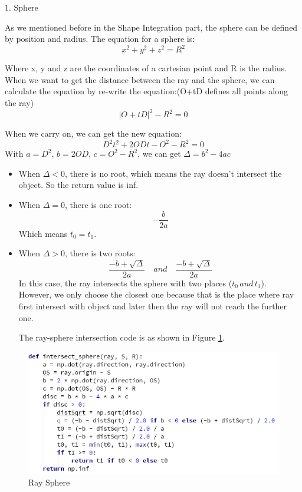 \documentclass[a4paper, 12pt]{article}
\begin{document}
1. Sphere

As we mentioned before in the Shape Integration part, the sphere can be defined by position and radius. The equation for a sphere is: $$ x^2 + y^2 + z^2 = R^2$$

Where x, y and z are the coordinates of a cartesian point and R is the radius. When we want to get the distance between the ray and the sphere, we can calculate the equation by re-write the equation:(O+tD defines all points along the ray) $$|O+ tD|^2 - R^2 = 0$$

When we carry on, we can get the new equation: $$D^2t^2+ 2ODt - O^2 - R^2= 0$$ With $a = D^2$, $b = 2OD $, $c = O^2 - R^2$, we can get $\Delta= b^2 - 4ac$

\begin{itemize}

\item When $\Delta < 0$, there is no root, which means the ray doesn't intersect the object. So the return value is inf.

\item When $\Delta = 0$, there is one root: $$-\frac{b}{2a}$$ Which means $t_0 = t_1$.

\item When $\Delta > 0$, there is two roots: $$\frac{-b + \sqrt{\Delta}}{2a}\quad and\quad \frac{-b + \sqrt{\Delta}}{2a}$$ In this case, the ray intersects the sphere with two places ($t_0\, and\, t_1$). However, we only choose the closest one because that is the place where ray first intersect with object and later then the ray will not reach the further one.

The ray-sphere intersection code is as shown in Figure \ref{fig:Ray Sphere}.
\end{itemize}

\begin{figure}[htb]
\centering
\includegraphics[scale=0.75]{ray_sphere.png}
\caption{Ray Sphere}
\label{fig:Ray Sphere}
\end{figure}  
\end{document}
